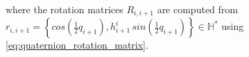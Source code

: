 \begin{algorithm}
%
where the rotation matrices $R_{i,i+1}$ are computed from 
$r_{i,i+1} = \left\{ cos\left(\frac{1}{2} q_{i+1}\right), h^i_{i+1}\,sin\left(\frac{1}{2} q_{i+1}\right) \right\} \in \mathbb{H}^*$
using \eqref{eq:quaternion_rotation_matrix}.

\end{algorithm}


%

